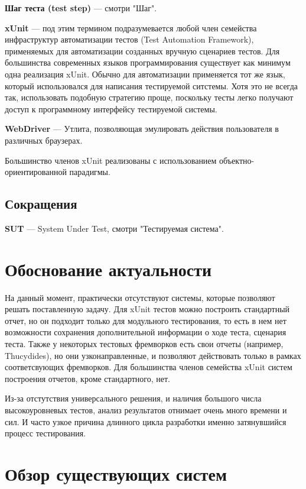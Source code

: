 {\bf Шаг теста (test step)} ---
смотри "Шаг".

{\bf xUnit} ---
под этим термином подразумевается любой член семейства инфраструктур автоматизации тестов (Test Automation Framework), применяемых для автоматизации созданных вручную сценариев тестов. Для большинства современных языков программирования существует как минимум одна реализация xUnit. Обычно для автоматизации применяется тот же язык, который использовался для написания тестируемой ситстемы. Хотя это не всегда так, использовать подобную стратегию проще, поскольку тесты легко получают доступ к программному интерфейсу тестируемой системы.

{\bf WebDriver} ---
Утлита, позволяющая эмулировать действия пользователя в различных браузерах.

Большинство членов xUnit реализованы с использованием объектно-ориентированной парадигмы.

\subsection{Сокращения}

{\bf SUT} --- System Under Test, смотри "Тестируемая система".

\section{Обоснование актуальности}

На данный момент, практически отсутствуют системы, которые позволяют решать поставленную задачу. Для xUnit тестов можно построить стандартный отчет, но он подходит только для модульного тестирования, то есть в нем нет возможности сохранения дополнительной информации о ходе теста, сценария теста. Также у некоторых тестовых фремворков есть свои отчеты (например, Thucydides), но они узконаправленные, и позволяют действовать только в рамках соответсвующих фремворков. Для большинства членов семейства xUnit систем построения отчетов, кроме стандартного, нет.

Из-за отстутствия универсального решения, и наличия большого числа высокоуровневых тестов, анализ результатов отнимает очень много времени и сил. И часто узкое причина длинного цикла разработки именно затянувшийся процесс тестирования.

\section{Обзор существующих систем}


